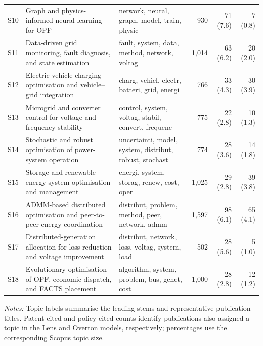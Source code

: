\documentclass[a4paper,fleqn]{cas-sc}
\begin{document}
\begin{table}[htbp]
{\begin{tabular}{lp{43mm}p{38mm}rrr}
S10 & Graph and physics-informed neural learning for OPF
& network, neural, graph, model, train, physic
& 930 & 71 (7.6) & 7 (0.8) \\

S11 & Data-driven grid monitoring, fault diagnosis, and state estimation
& fault, system, data, method, network, voltag
& 1,014 & 63 (6.2) & 20 (2.0) \\

S12 & Electric-vehicle charging optimisation and vehicle--grid integration
& charg, vehicl, electr, batteri, grid, energi
& 766 & 33 (4.3) & 30 (3.9) \\

S13 & Microgrid and converter control for voltage and frequency stability
& control, system, voltag, stabil, convert, frequenc
& 775 & 22 (2.8) & 10 (1.3) \\

S14 & Stochastic and robust optimisation of power-system operation
& uncertainti, model, system, distribut, robust, stochast
& 774 & 28 (3.6) & 14 (1.8) \\

S15 & Storage and renewable-energy system optimisation and management
& energi, system, storag, renew, cost, oper
& 1,025 & 29 (2.8) & 39 (3.8) \\

S16 & ADMM-based distributed optimisation and peer-to-peer energy coordination
& distribut, problem, method, peer, network, admm
& 1,597 & 98 (6.1) & 65 (4.1) \\

S17 & Distributed-generation allocation for loss reduction and voltage improvement
& distribut, network, loss, voltag, system, load
& 502 & 28 (5.6) & 5 (1.0) \\

S18 & Evolutionary optimisation of OPF, economic dispatch, and FACTS placement
& algorithm, system, problem, bus, genet, cost
& 1,000 & 28 (2.8) & 12 (1.2) \\

\bottomrule
\end{tabular}%
}
\vspace{2mm}
\begin{minipage}{\textwidth}
\footnotesize
\textit{Notes:} Topic labels summarise the leading stems and representative publication titles. Patent-cited and policy-cited counts identify publications also assigned a topic in the Lens and Overton models, respectively; percentages use the corresponding Scopus topic size.
\end{minipage}
\end{table}
\end{document}
